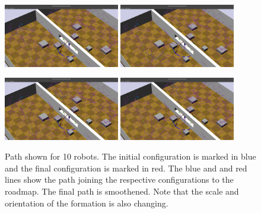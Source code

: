 \documentclass[12pt,a4paper, onecolumn]{IEEEtran}
\begin{document}
\begin{figure}[bpt]
  \centerline{\includegraphics[width=0.45\textwidth]{lPath_start.png} %
  \includegraphics[width=0.45\textwidth]{lPath_mid0.png}} \vspace{0.05in}
  \centerline{\includegraphics[width=0.45\textwidth]{lPath_mid.png} %
  \includegraphics[width=0.45\textwidth]{lPath_end.png}}
  \caption{Path shown for 10 robots. The initial configuration is marked in blue and the
  final configuration is marked in red. The blue and and red lines show the path joining
the respective configurations to the roadmap. The final path is smoothened. Note that the
scale and orientation of the formation is also changing.}
  \label{fig:ten}
\end{figure}




\end{document}

